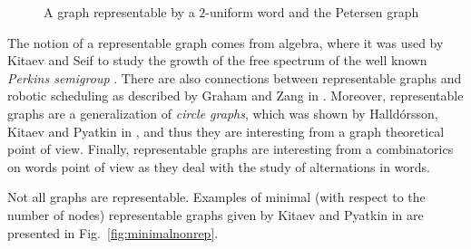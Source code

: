 \documentclass[12pt]{article}
\begin{document}
\begin{figure}[h]
\begin{center}

 \caption{A graph representable by a $2$-uniform word and the Petersen graph}
 \label{fig:petersen}
\end{center}
\end{figure}

The notion of a representable graph comes from algebra, where it was used by Kitaev and Seif to study the growth of the free spectrum of the well known {\em Perkins semigroup}  \cite{KS}. There are also connections between representable graphs and robotic scheduling as described by Graham and Zang in \cite{GZ}. Moreover, representable graphs are a generalization of {\em circle graphs}, which was shown by  Halld\'orsson, Kitaev and Pyatkin in \cite{HKP1}, and thus they are interesting from a graph theoretical point of view. Finally, representable graphs are interesting from a combinatorics on words point of view as they deal with the study of alternations in words.

Not all graphs are representable. Examples of minimal (with respect to the number of nodes) representable graphs given by Kitaev and Pyatkin in \cite{KP} are presented in Fig.~\ref{fig:minimalnonrep}.
\end{document}
